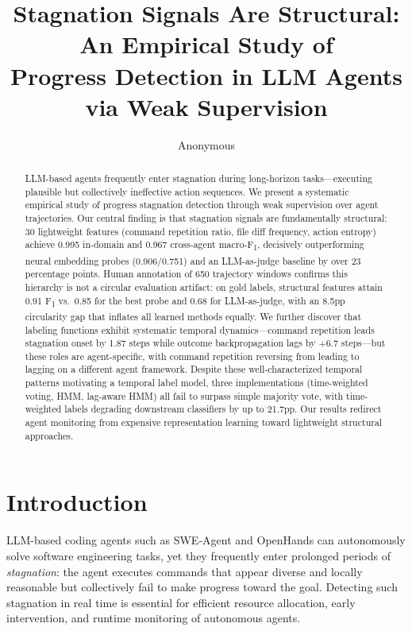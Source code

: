 \documentclass[11pt,a4paper]{article}
\title{Stagnation Signals Are Structural: An Empirical Study of\\Progress Detection in LLM Agents via Weak Supervision}
\author{Anonymous}
\newcommand{\fone}{F\textsubscript{1}}
\begin{document}
\maketitle

\begin{abstract}
LLM-based agents frequently enter stagnation during long-horizon tasks---executing plausible but collectively ineffective action sequences.
We present a systematic empirical study of progress stagnation detection through weak supervision over agent trajectories.
Our central finding is that stagnation signals are fundamentally structural: 30 lightweight features (command repetition ratio, file diff frequency, action entropy) achieve 0.995 in-domain and 0.967 cross-agent macro-\fone{}, decisively outperforming neural embedding probes (0.906/0.751) and an LLM-as-judge baseline by over 23 percentage points.
Human annotation of 650 trajectory windows confirms this hierarchy is not a circular evaluation artifact: on gold labels, structural features attain 0.91 \fone{} vs.\ 0.85 for the best probe and 0.68 for LLM-as-judge, with an 8.5pp circularity gap that inflates all learned methods equally.
We further discover that labeling functions exhibit systematic temporal dynamics---command repetition leads stagnation onset by 1.87 steps while outcome backpropagation lags by +6.7 steps---but these roles are agent-specific, with command repetition reversing from leading to lagging on a different agent framework.
Despite these well-characterized temporal patterns motivating a temporal label model, three implementations (time-weighted voting, HMM, lag-aware HMM) all fail to surpass simple majority vote, with time-weighted labels degrading downstream classifiers by up to 21.7pp.
Our results redirect agent monitoring from expensive representation learning toward lightweight structural approaches.
\end{abstract}

\section{Introduction}
\label{sec:intro}

LLM-based coding agents such as SWE-Agent \cite{yang2024sweagent} and OpenHands \cite{wang2024openhands} can autonomously solve software engineering tasks, yet they frequently enter prolonged periods of \emph{stagnation}: the agent executes commands that appear diverse and locally reasonable but collectively fail to make progress toward the goal.
Detecting such stagnation in real time is essential for efficient resource allocation, early intervention, and runtime monitoring of autonomous agents.
\end{document}
